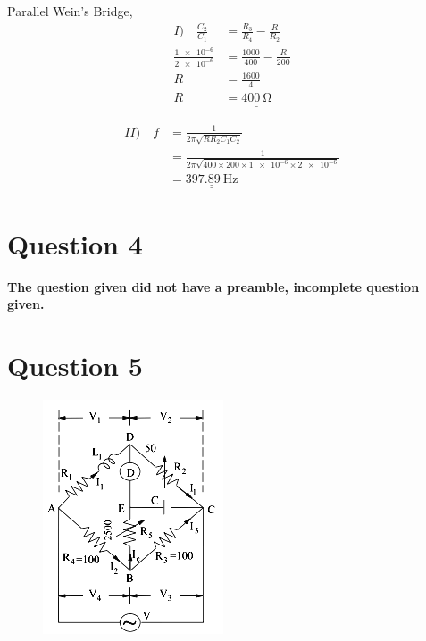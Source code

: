 \documentclass[12pt]{article}
\begin{document}
Parallel Wein's Bridge,
\begin{align*}
I) \quad\frac{C_2}{C_1} &= \frac{R_3}{R_4} - \frac{R}{R_2} \\
\frac{\num{1e-6}}{\num{2e-6}} &= \frac{1000}{400}-\frac{R}{200} \\
R &= \frac{1600}{4} \\
R  &= \underline{\underline{\qty{400}{\ohm}}}
\end{align*}

\begin{align*}
II) \quad f &= \frac{1}{2\pi\sqrt{RR_2C_1C_2}} \\
			&= \frac{1}{2\pi\sqrt{400\times200\times\num{1e-6}\times\num{2e-6}}} \\
			&= \underline{\underline{\qty{397.89}{\hertz}}}
\end{align*}

\vspace{2cm}
\section*{Question 4}
\textbf{The question given did not have a preamble, incomplete question given.}

\section*{Question 5}
\begin{figure}[H]
	\includegraphics[width=\textwidth]{ac5}
\end{figure}
\end{document}
